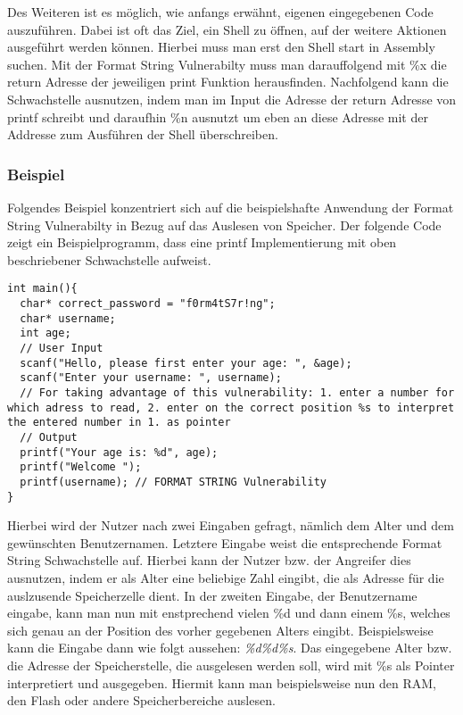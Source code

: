 \documentclass[a4paper,
DIV=13,
12pt,
BCOR=10mm,
department=FakIM,
oneside,
parskip=half,
automark,
listof=totocnumbered,
bibliography=totocnumbered,
acronym=totocnumbered
] {OTHRartcl}
\begin{document}
Des Weiteren ist es möglich, wie anfangs erwähnt, eigenen eingegebenen Code auszuführen. Dabei ist oft das Ziel,
ein Shell zu öffnen, auf der weitere Aktionen ausgeführt werden können.
Hierbei muss man erst den Shell start in Assembly suchen. Mit der Format String Vulnerabilty muss man darauffolgend mit \%x die return Adresse
der jeweiligen print Funktion herausfinden. Nachfolgend kann die Schwachstelle ausnutzen, indem man im Input die Adresse der return Adresse von printf schreibt
und daraufhin \%n ausnutzt um eben an diese Adresse mit der Addresse zum Ausführen der Shell überschreiben.

\subsubsection{Beispiel}
Folgendes Beispiel konzentriert sich auf die beispielshafte Anwendung der Format String Vulnerabilty in Bezug auf das Auslesen von Speicher.
Der folgende Code zeigt ein Beispielprogramm, dass eine printf Implementierung mit oben beschriebener Schwachstelle aufweist.
\begin{verbatim}
int main(){
  char* correct_password = "f0rm4tS7r!ng";
  char* username;
  int age;
  // User Input
  scanf("Hello, please first enter your age: ", &age);
  scanf("Enter your username: ", username);
  // For taking advantage of this vulnerability: 1. enter a number for which adress to read, 2. enter on the correct position %s to interpret the entered number in 1. as pointer
  // Output
  printf("Your age is: %d", age);
  printf("Welcome ");
  printf(username); // FORMAT STRING Vulnerability
}
\end{verbatim}
Hierbei wird der Nutzer nach zwei Eingaben gefragt, nämlich dem Alter und dem gewünschten Benutzernamen.
Letztere Eingabe weist die entsprechende Format String Schwachstelle auf.
Hierbei kann der Nutzer bzw. der Angreifer dies ausnutzen, indem er als Alter eine beliebige Zahl eingibt, die als Adresse für die auslzusende Speicherzelle dient.
In der zweiten Eingabe, der Benutzername eingabe, kann man nun mit enstprechend vielen \%d und dann einem \%s, welches sich genau an der Position des
vorher gegebenen Alters eingibt. Beispielsweise kann die Eingabe dann wie folgt aussehen: \textit{\%d\%d\%s}.
Das eingegebene Alter bzw. die Adresse der Speicherstelle, die ausgelesen werden soll, wird mit \%s als Pointer interpretiert und ausgegeben.
Hiermit kann man beispielsweise nun den RAM, den Flash oder andere Speicherbereiche auslesen.
\end{document}

